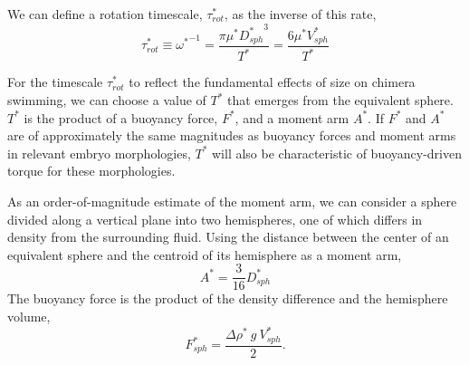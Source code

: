 \documentclass[10pt,a4paper]{article}
\begin{document}
We can define a rotation timescale, $\tau^*_{rot}$, as the inverse of this rate,
\begin{equation}\label{tau1}
	\tau^*_{rot} \equiv {\omega^*}^{-1} = \frac{\pi \mu^* {D_{sph}^*}^3}{T^*} = \frac{6 \mu^* V_{sph}^*}{T^*}
\end{equation}

For the timescale $\tau^*_{rot}$ to reflect the fundamental effects of size on chimera swimming, we can choose a value of $T^*$ that emerges from the equivalent sphere.
$T^*$ is the product of a buoyancy force, $F^*$, and a moment arm $A^*$.
If $F^*$ and $A^*$ are of approximately the same magnitudes as buoyancy forces and moment arms in relevant embryo morphologies, $T^*$ will also be characteristic of buoyancy-driven torque for these morphologies.

As an order-of-magnitude estimate of the moment arm, we can consider a sphere divided along a vertical plane into two hemispheres, one of which differs in density from the surrounding fluid. Using the distance between the center of an equivalent sphere and the centroid of its hemisphere as a moment arm,
\begin{equation}\label{arm}
	A^* = \frac{3}{16} D_{sph}^*
\end{equation}
The buoyancy force is the product of the density difference and the hemisphere volume,
%
\begin{equation}\label{charF}
	F_{sph}^* = \frac{\Delta \rho^* ~ g ~ V_{sph}^*}{2}.  %
\end{equation} 
\end{document}
